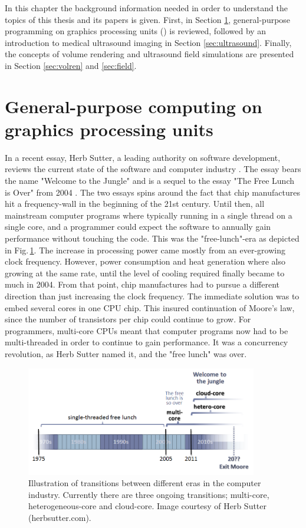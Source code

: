 %

In this chapter the background information needed in order to understand the topics of this thesis and its papers is given. First, in Section \ref{sec:gpgpu}, general-purpose programming on graphics processing units () is reviewed, followed by an introduction to medical ultrasound imaging in Section \ref{sec:ultrasound}. Finally, the concepts of volume rendering and ultrasound field simulations are presented in Section \ref{sec:volren} and \ref{sec:field}.

\section{General-purpose computing on graphics processing units}\label{sec:gpgpu}
In a recent essay, Herb Sutter, a leading authority on software development, reviews the current state of the software and computer industry \cite{HerbSutter}. The essay bears the name "Welcome to the Jungle" and is a sequel to the essay "The Free Lunch is Over" from 2004 \cite{HerbSuttera}. The two essays spins around the fact that chip manufactures hit a frequency-wall in the beginning of the 21st century. Until then, all mainstream computer programs where typically running in a single thread on a single core, and a programmer could expect the software to annually gain performance without touching the code. This was the "free-lunch"-era as depicted in Fig.\,\ref{fig:jungle}. The increase in processing power came mostly from an ever-growing clock frequency. However, power consumption and heat generation where also growing at the same rate, until the level of cooling required finally became to much in 2004.  From that point, chip manufactures had to pursue a different direction  than just increasing the clock frequency. The immediate solution was to embed several cores in one CPU chip. This insured continuation of Moore's law, since the number of transistors per chip could continue to grow. For programmers, multi-core CPUs meant that computer programs now had to be multi-threaded in order to continue to gain performance. It was a concurrency revolution, as Herb Sutter named it, and  the "free lunch" was over.

\begin{figure}
\centering
\includegraphics[width=0.9\textwidth]{img/free_lunsh.png}
\caption{Illustration of transitions between different eras in the computer industry. Currently there are three ongoing transitions; multi-core, heterogeneous-core and cloud-core. Image courtesy of Herb Sutter (herbsutter.com).}
\label{fig:jungle}
\end{figure}

